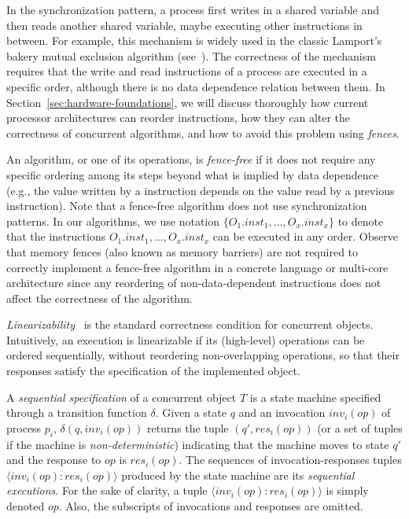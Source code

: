 In the \RAW{} synchronization pattern, a process first writes in a shared variable and then reads another shared variable, maybe executing other instructions in between. For example, this mechanism is widely used in the classic Lamport's bakery mutual exclusion algorithm (see~\cite {DBLP_books_daglib_0020056}). The correctness of the mechanism requires that the write and read instructions of a process are executed in a specific order, although there is no data dependence relation between them. In Section~\ref{sec:hardware-foundations}, we will discuss thoroughly how current processor architectures can reorder instructions, how they can alter the correctness of concurrent algorithms, and how to avoid this problem using \emph{fences}.

An algorithm, or one of its operations, is \emph{fence-free} if it does not require any specific ordering among its steps beyond what is implied by data dependence (e.g., the value written by a \W{} instruction depends on the value read by a previous \R instruction). Note that a fence-free algorithm does not use \RAW{} synchronization patterns. In our algorithms, we use notation \(\{O_1.inst_1, \ldots, O_x.inst_x\}\) to denote that the instructions \(O_1.inst_1, \ldots, O_x.inst_x\) can be executed in any order. Observe that memory fences (also known as memory barriers) are not required to correctly implement a fence-free algorithm in a concrete language or multi-core architecture since any reordering of non-data-dependent instructions does not affect the correctness of the algorithm.

\emph{Linearizability}~\cite{DBLP_journals_toplas_HerlihyW90} is the standard correctness condition for concurrent objects. Intuitively, an execution is linearizable if its (high-level) operations can be ordered sequentially, without reordering non-overlapping operations, so that their responses satisfy the specification of the implemented object.

A \emph{sequential specification} of a concurrent object \(T\) is a state machine specified through a transition function \(\delta\). Given a state \(q\) and an invocation \(inv_i(op)\) of process \(p_i\), \(\delta(q, inv_i(op))\) returns the tuple \((q', res_i(op))\) (or a set of tuples if the machine is \emph{non-deterministic}) indicating that the machine moves to state \(q'\) and the response to \(op\) is \(res_i(op)\). The sequences of invocation-responses tuples \(\langle inv_i(op): res_i(op)\rangle\) produced by the state machine are its \emph{sequential executions}. For the sake of clarity, a tuple \(\langle inv_i(op): res_i(op)\rangle\) is simply denoted \(op\). Also, the subscripts of invocations and responses are omitted.

